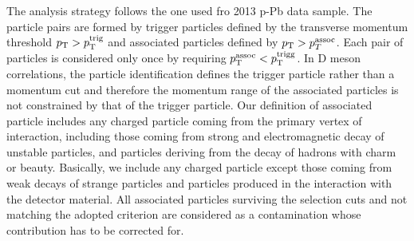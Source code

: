 The analysis strategy follows the one used fro 2013 p-Pb data sample. The particle pairs are formed by
trigger particles defined by the transverse momentum threshold $p_{\rm T}>p_{\rm T}^{\rm trig}$ and associated particles defined by $p_{\rm T}>p_{T}^{\rm assoc}$. Each
pair of particles is considered only once by
requiring $p_{\rm T}^{\rm assoc}<p_{\rm T}^{\rm trigg}$. In D meson correlations, the particle identification
defines the trigger particle rather than a momentum cut and therefore the momentum
range of the associated particles is not constrained by that of the trigger particle. Our definition of
associated particle includes any charged particle coming from the primary vertex of interaction, including
those coming from strong and electromagnetic decay of unstable particles, and particles deriving from the
decay of hadrons with charm or beauty. 
Basically, we include any charged particle except those coming from weak decays of strange particles and particles produced in the interaction with the detector material.
All associated particles surviving the selection
cuts and not matching the adopted criterion are considered as a contamination whose contribution has to be corrected for. \\

